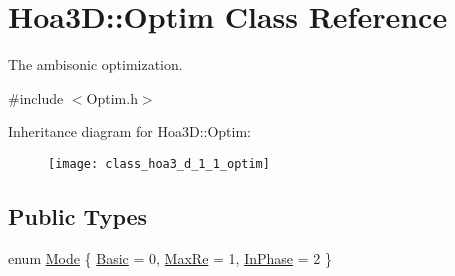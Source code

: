 \hypertarget{class_hoa3_d_1_1_optim}{\section{Hoa3\-D\-:\-:Optim Class Reference}
\label{class_hoa3_d_1_1_optim}
}


The ambisonic optimization.  




{\ttfamily \#include $<$Optim.\-h$>$}

Inheritance diagram for Hoa3\-D\-:\-:Optim\-:\begin{figure}[H]
\begin{center}
\leavevmode
\texttt{[image: class\_hoa3\_d\_1\_1\_optim]}
\end{center}
\end{figure}
\subsection*{Public Types}
\begin{DoxyCompactItemize}
\item 
enum \hyperlink{class_hoa3_d_1_1_optim_a1a153ac21e7a112279824f17981cf147}{Mode} \{ \hyperlink{class_hoa3_d_1_1_optim_a1a153ac21e7a112279824f17981cf147a89acb58975922396713cc88cafc55b45}{Basic} = 0, 
\hyperlink{class_hoa3_d_1_1_optim_a1a153ac21e7a112279824f17981cf147a491a405ba48de3977668d54a8d9ff44a}{Max\-Re} = 1, 
\hyperlink{class_hoa3_d_1_1_optim_a1a153ac21e7a112279824f17981cf147a55da4ad4519ee8860e9ea45cc475241c}{In\-Phase} = 2
 \}
\end{DoxyCompactItemize}
